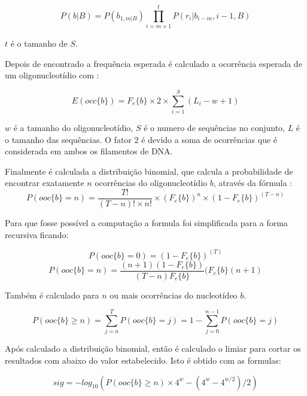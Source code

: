 \begin{equation}
P(b|B)=P(b_{1,m|B}) \prod_{i=m+1}^{t}P(r_{i}|b_{i-m},i-1,B)
\end{equation} 

$t$ é o tamanho de $S$.

Depois de encontrado a frequência esperada é calculado a ocorrência esperada de um oligonucleotídio com :

\begin{equation}
    E(occ\lbrace b \rbrace) = F_{e}\{ b \}\times 2 \times \sum_{i=1}^{S}(L_{i} - w + 1)
\end{equation} 

$w$ é a tamanho do oligonucleotídio, $S$ é o numero de sequências no conjunto, $L$ é o tamanho das sequências. O fator 2 é devido a soma de ocorrências que é considerada em ambos os filamentos de DNA.

Finalmente é calculada a distribuição binomial, que calcula a probabilidade de encontrar exatamente $n$ ocorrências do oligonucleotídio $b$, através da fórmula :
\begin{equation}
P(ooc \lbrace b \rbrace = n) = \frac{T!}{(T -n)! \times n!} \times (F_{e}\{ b \})^n \times (1 - F_{e}\{ b \})^{(T -n)}
\end{equation}

Para que fosse possível a computação a formula foi simplificada para a forma recursiva ficando:

\begin{equation}
P(ooc \lbrace b \rbrace = 0) = (1 - F_{e}\{ b \})^{(T)}
\end{equation}
\begin{equation}
P(ooc \lbrace b \rbrace = n) = \frac{(n + 1)(1 - F_{e}\{ b \})}{(T - n)F_{e}\{ b \}}(F_{e}\{ b \}(n+1)
\end{equation}

Também é calculado para $n$ ou mais ocorrências do nucleotídeo $b$.

\begin{equation}
P(ooc \lbrace b \rbrace \geq n) = \sum_{j=n}^{T}P(ooc \lbrace b \rbrace = j) = 1 - \sum_{j=0}^{n-1}P(ooc \lbrace b \rbrace = j)
\end{equation}

Após calculado a distribuição binomial, então é calculado o limiar para cortar os resultados com abaixo do valor estabelecido. Isto é obtido com as formulas:

\begin{equation}
sig = -log_{10}(P(ooc \lbrace b \rbrace \geq n) \times 4^{w} - (4^{w} - 4^{w/2})/2)
\end{equation}

